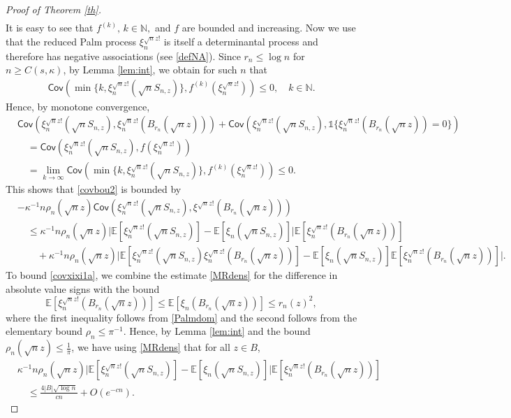 \documentclass{amsart}
\theoremstyle{plain}
\theoremstyle{definition}
\theoremstyle{remark}
\def\E{\mathbb E}
\def\one{\mathds1}
\def\Cov{\mathsf{Cov}}
\begin{document}
\begin{proof}[Proof of Theorem \ref{th}]
\begin{align*}
\end{align*}
It is easy to see that $f^{(k)},\, k \in \mathbb{ N},$ and $f$ are bounded and increasing. Now we use that the reduced Palm process $\xi_n^{\sqrt nz!}$ is itself  a determinantal process and therefore has negative associations (see \eqref{defNA}). Since $r_n\le \log n$ for $n \ge C(s, \kappa)$, by Lemma \ref{lem:int}, we obtain for such $n$ that 
\begin{align*}
	\Cov(\min\{k,\xi_n^{\sqrt nz!}(\sqrt nS_{n,z})\}, f^{(k)}(\xi_n^{\sqrt nz!}))\le 0, \quad k \in \mathbb N. 
\end{align*}
Hence, by monotone convergence,
\begin{align*}
	&\Cov(\xi_n^{\sqrt nz!}(\sqrt nS_{n,z}),\xi_n^{\sqrt nz!}(B_{r_n}(\sqrt nz)))+\Cov(\xi_n^{\sqrt nz!}(\sqrt nS_{n,z}), \one \{\xi_n^{\sqrt nz!}(B_{r_n}(\sqrt nz))=0\})\nonumber\\
	&\quad=\Cov(\xi_n^{\sqrt nz!}(\sqrt nS_{n,z}), f(\xi_n^{\sqrt nz!}))\\
	&\quad =\lim_{k \to \infty} \Cov(\min\{k,\xi_n^{\sqrt nz!}(\sqrt nS_{n,z})\}, f^{(k)}(\xi_n^{\sqrt nz!})) \le 0.
\end{align*}
This shows that \eqref{covbou2} is bounded by
	\begin{align}
		&-\kappa^{-1}n \rho_n(\sqrt n z)\Cov(\xi_n^{\sqrt nz!}(\sqrt nS_{n,z}),\xi^{\sqrt nz!}(B_{r_n}(\sqrt nz)))\nonumber\\
		&\quad \le \kappa^{-1}n \rho_n(\sqrt n z) \big|\E [\xi_n^{\sqrt nz!} (\sqrt nS_{n,z})] - \E[\xi_n(\sqrt nS_{n,z})]\big| \E[\xi_n^{\sqrt nz!}(B_{r_n}(\sqrt nz))]	\label{covxixi1a}\\
		&\qquad+ \kappa^{-1}n \rho_n(\sqrt n z) \big|\E[\xi_n^{\sqrt nz!}(\sqrt nS_{n,z})\xi_n^{\sqrt nz!}(B_{r_n}(\sqrt{n} z))] - \E[\xi_n(\sqrt nS_{n,z})]\E[\xi_n^{\sqrt nz!}(B_{r_n}(\sqrt nz))]\big|.
		\label{covxixi1b}
	\end{align}
	To bound \eqref{covxixi1a}, we combine the estimate  \eqref{MRdens} for the difference in absolute value signs with the bound \[\E[\xi_n^{\sqrt nz!}(B_{r_n}(\sqrt nz))] \le \E[\xi_n(B_{r_n}(\sqrt nz))] \le r_n(z)^2,\] 
where the first inequality follows from \eqref{Palmdom} and the second follows from the elementary bound $\rho_n \le \pi^{-1}$. 
Hence, by Lemma \ref{lem:int} and the bound $\rho_n(\sqrt n z) \le \frac 1 \pi$,  we have using \eqref{MRdens} that for all $z \in B$, 
\begin{align}
&\kappa^{-1}n \rho_n(\sqrt n z) 	\big|\E [\xi_n^{\sqrt nz!} (\sqrt nS_{n,z})] - \E[\xi_n(\sqrt n S_{n,z})]\big| \E[\xi_n^{\sqrt nz!}(B_{r_n}(\sqrt nz))]\nonumber\\
&\quad  \le{ \frac{4  |B|\sqrt{\log n}}{cn}}+O(e^{-cn}).\label{eq:cont2}
\end{align}


\end{proof}
\end{document}
